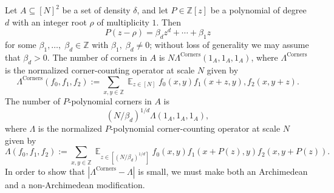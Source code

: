 \documentclass[11pt]{amsart}
\theoremstyle{definition}
\DeclareMathOperator*{\E}{\mathbb{E}}
\newcommand{\Z}{{\mathbb Z}}
\DeclareMathOperator{\corners}{Corners}
\begin{document}
Let $A \subseteq [N]^2$ be a set of density $\delta$, and let $P \in \mathbb{Z}[z]$ be a polynomial of degree $d$ with an integer root $\rho$ of multiplicity $1$. Then $$P(z-\rho)=\beta_dz^d+\cdots+\beta_1 z$$ for some $\beta_1, \ldots,\; \beta_d\in\Z$ with $\beta_1,\; \beta_d \neq 0$; without loss of generality we may assume that $\beta_d>0$.  The number of corners in $A$ is $N\Lambda^{\corners}(1_A,1_A,1_A)$, where $\Lambda^{\corners}$ is the normalized {corner-counting operator} at scale $N$ given by
$$\Lambda^{\corners}(f_0,f_1,f_2):=\sum_{x,y \in \Z} \E_{z \in [N]}f_0(x,y)f_1(x+z,y),f_2(x,y+z).$$
The number of $P$-polynomial corners in $A$ is $$(N/\beta_d)^{1/d}\Lambda(1_A,1_A,1_A),$$
where $\Lambda$ is the {normalized $P$-polynomial corner-counting operator} at scale $N$ given by
$$\Lambda(f_0,f_1,f_2):=\sum_{x,y \in \mathbb{Z}}\E_{z \in [(N/\beta_d)^{1/d}]} f_0(x,y)f_1(x+P(z),y)f_2(x,y+P(z)).$$
In order to show that $|\Lambda^{\corners}-\Lambda|$ is small, we must make both an Archimedean and a non-Archimedean modification.
\end{document}
